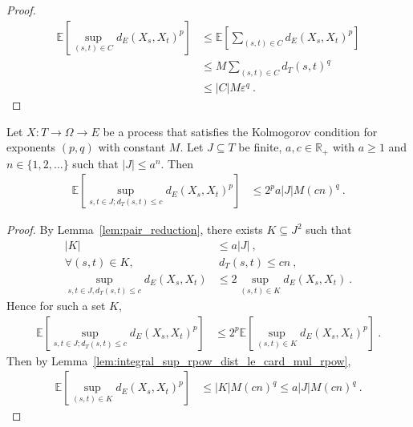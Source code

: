\begin{proof}\leanok
\begin{align*}
  \mathbb{E}\left[\sup_{(s,t) \in C} d_E(X_s, X_t)^p \right]
  &\le \mathbb{E}\left[\sum_{(s,t) \in C} d_E(X_s, X_t)^p \right]
  \\
  &\le M \sum_{(s,t) \in C} d_T(s, t)^q
  \\
  &\le \vert C \vert M \varepsilon^q
  \: .
\end{align*}
\end{proof}


\begin{lemma}\label{lem:integral_sup_rpow_dist_of_dist_le}
  \leanok
Let $X : T \to \Omega \to E$ be a process that satisfies the Kolmogorov condition for exponents $(p,q)$ with constant $M$.
Let $J \subseteq T$ be finite, $a, c \in \mathbb R_+$ with $a \ge 1$ and $n \in \{1, 2, ...\}$ such that $|J| \le a^n$.
Then
\begin{align*}
  \mathbb{E} \left[ \sup_{s, t \in J; d_T(s, t) \le c} d_E(X_s, X_t)^p \right]
  &\le 2^p a |J| M (cn)^q
  \: .
\end{align*}
\end{lemma}

\begin{proof}\leanok
By Lemma~\ref{lem:pair_reduction}, there exists $K \subseteq J^2$ such that
\begin{align*}
  |K|
  & \le a |J|
  \:, \\
  \forall (s,t) \in K,
  & \ d_T(s,t) \le c n
  \:, \\
  \sup_{s,t\in J, d_T(s,t) \le c} d_E(X_s, X_t)
  & \le 2 \sup_{(s,t) \in K} d_E(X_s, X_t)
  \: .
\end{align*}
Hence for such a set $K$,
\begin{align*}
  \mathbb{E} \left[ \sup_{s, t \in J; d_T(s, t) \le c} d_E(X_s, X_t)^p \right]
  &\le 2^p \mathbb{E} \left[ \sup_{(s, t) \in K} d_E(X_s, X_t)^p \right]
  \: .
\end{align*}
Then by Lemma~\ref{lem:integral_sup_rpow_dist_le_card_mul_rpow},
\begin{align*}
  \mathbb{E} \left[ \sup_{(s, t) \in K} d_E(X_s, X_t)^p \right]
  &\le |K| M (cn)^q
  \le a |J| M (cn)^q
  \: .
\end{align*}
\end{proof}


